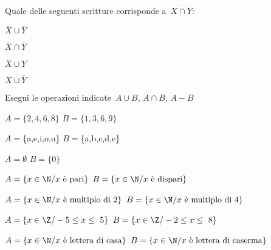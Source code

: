 \begin{esercizio}
\label{ese:7.56}
Quale delle seguenti scritture corrisponde a~\(\overline{{X\cap 
\overline{Y}}}\):
\vspace{-6pt}
\begin{multicols}{4}
 \begin{enumeratea}
 \item \(\overline{X}\cup \overline{Y}\)
 \item \(\overline{X}\cap \overline{Y}\)
 \item \(\overline{X}\cup Y\)
 \item \(X\cup \overline{Y}\)
 \end{enumeratea}
\end{multicols}
\end{esercizio}


\begin{esercizio}
\label{ese:7.57}
Esegui le operazioni indicate~\(A\cup B\), \(A\cap B\), \(A-B\)
\vspace{-6pt}

\begin{enumeratea}
\item \(A=\{2,4,6,8\}\) \(B=\{1,3,6,9\}\)
\item \(A=\)\{a,e,i,o,u\} \(B=\)\{a,b,c,d,e\}
\item \(A=\emptyset \) \(B=\{0\}\)
\item \(A=\{x\in\N/ x\text{ è pari}\}\) \(B=\{x\in\N/ x\text{ è dispari}\}\)
\item \(A=\{x\in\N/ x\text{ è multiplo di~2}\}\) \(B=\{x\in\N/ x\text{ è 
multiplo di~4}\}\)
\item \(A=\{x\in\Z/-5\le x\le~5\}\) \(B=\{x\in\Z/-2\le x\le~8\}\)
\item \(A=\{x\in\N/ x\text{ è lettera di casa}\}\) \(B=\{x\in\N/ x\text{ è 
lettera di caserma}\}\)
\end{enumeratea}
\end{esercizio}

